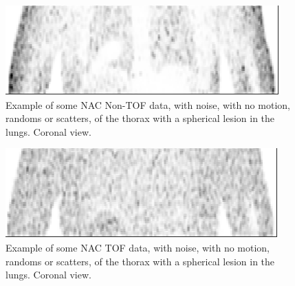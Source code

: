                 \begin{figure}
                    \centering
                    
                    \includegraphics[width=1.0\linewidth]{figures/background_non_tof_example.png}
                    
                    \captionsetup{singlelinecheck=false}
                    \caption{
                        Example of some \gls{NAC} \gls{Non-TOF} data, with noise, with no motion, randoms or scatters, of the thorax with a spherical lesion in the lungs. Coronal view.
                    }
                    \label{fig:time_of_flight_pet_non_tof_example}
                \end{figure}
                
                \begin{figure}
                    \centering
                    
                    \includegraphics[width=1.0\linewidth]{figures/background_tof_example.png}
                    
                    \captionsetup{singlelinecheck=false}
                    \caption{
                        Example of some \gls{NAC} \gls{TOF} data, with noise, with no motion, randoms or scatters, of the thorax with a spherical lesion in the lungs. Coronal view.
                    }
                    \label{fig:time_of_flight_pet_tof_example}
                \end{figure}
                
